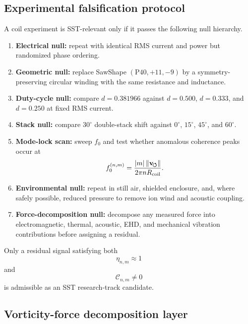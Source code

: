 \subsection{Experimental falsification protocol}

A coil experiment is SST-relevant only if it passes the following null hierarchy.

\begin{enumerate}
\item \textbf{Electrical null:} repeat with identical RMS current and power but randomized phase ordering.
\item \textbf{Geometric null:} replace SawShape $(\mathrm{P40},+11,-9)$ by a symmetry-preserving circular winding with the same resistance and inductance.
\item \textbf{Duty-cycle null:} compare $d=0.381966$ against $d=0.500$, $d=0.333$, and $d=0.250$ at fixed RMS current.
\item \textbf{Stack null:} compare $30^\circ$ double-stack shift against $0^\circ$, $15^\circ$, $45^\circ$, and $60^\circ$.
\item \textbf{Mode-lock scan:} sweep $f_0$ and test whether anomalous coherence peaks occur at
\[
f_0^{(n,m)}
=
\frac{|m|\,\lVert\mathbf{v}_{\!\boldsymbol{\circlearrowleft}}\rVert}{2\pi n R_{\mathrm{coil}}}.
\]
\item \textbf{Environmental null:} repeat in still air, shielded enclosure, and, where safely possible, reduced pressure to remove ion wind and acoustic coupling.
\item \textbf{Force-decomposition null:} decompose any measured force into electromagnetic, thermal, acoustic, EHD, and mechanical vibration contributions before assigning a residual.
\end{enumerate}

Only a residual signal satisfying both
\begin{equation}
\eta_{n,m}\approx 1
\end{equation}
and
\begin{equation}
\mathcal{C}_{n,m}\neq 0
\end{equation}
is admissible as an SST research-track candidate.

\subsection{Vorticity-force decomposition layer}

